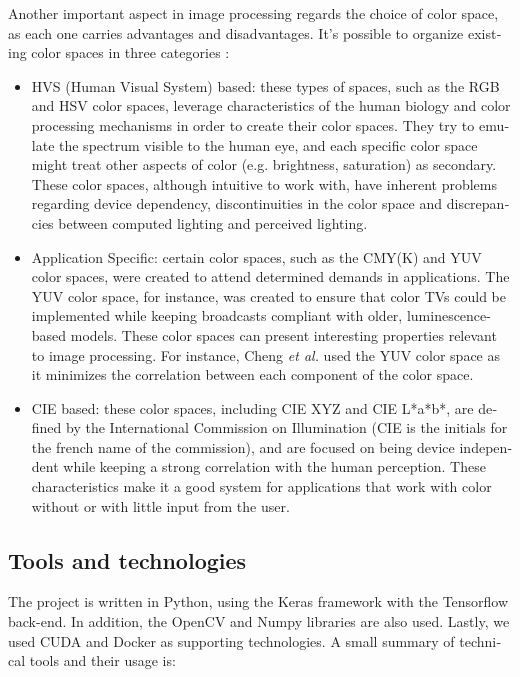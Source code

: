 \documentclass[12pt,openright,oneside,a4paper,english]{abntex2}
\begin{document}
\begin{otherlanguage}{english}
Another important aspect in image processing regards the choice of color space, as each one carries advantages and disadvantages. It's possible to organize existing color spaces in three categories \cite{colorspace}:
\begin{itemize}
    \item HVS (Human Visual System) based: these types of spaces, such as the RGB and HSV color spaces, leverage characteristics of the human biology and color processing mechanisms in order to create their color spaces. They  try to emulate the spectrum visible to the human eye, and each specific color space might treat other aspects of color (e.g. brightness, saturation) as secondary. These color spaces, although intuitive to work with, have inherent problems regarding device dependency, discontinuities in the color space and discrepancies between computed lighting and perceived lighting.
    \item Application Specific: certain color spaces, such as the CMY(K) and YUV color spaces, were created to attend determined demands in applications. The YUV color space, for instance, was created to ensure that color TVs could be implemented while keeping broadcasts compliant with older, luminescence-based models. These color spaces can present interesting properties relevant to image processing. For instance, Cheng \textit{et al.} \cite{Cheng2015} used the YUV color space as it minimizes the correlation between each component of the color space.
    \item  CIE based: these color spaces, including CIE XYZ and CIE L*a*b*, are defined by the International Commission on Illumination (CIE is the initials for the french name of the commission),  and are focused on being device independent while keeping a strong correlation with the human perception. These characteristics make it a good system for applications that work with color without or with little input from the user.
\end{itemize}

\subsection{Tools and technologies}
The project is written in Python, using the Keras framework with the Tensorflow back-end. In addition, the OpenCV and Numpy libraries are also used. Lastly, we used CUDA and Docker as supporting technologies. A small summary of technical tools and their usage is:


\end{otherlanguage}
\end{document}
